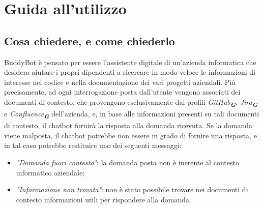 
\section{Guida all’utilizzo}
\label{sec:guida_utilizzo}


\subsection{Cosa chiedere, e come chiederlo}
\label{subsec:cosa_come_chiedere}

BuddyBot è pensato per essere l'assistente digitale di un'azienda informatica che desidera aiutare i propri dipendenti a ricercare in
modo veloce le informazioni di interesse nel codice e nella documentazione dei vari progetti aziendali. Più precisamente, ad
ogni interrogazione posta dall'utente vengono associati
dei documenti di contesto, che provengono esclusivamente dai profili \emph{GitHub}\textsubscript{\textbf{\textit{G}}},
\emph{Jira}\textsubscript{\textbf{\textit{G}}} e \emph{Confluence}\textsubscript{\textbf{\textit{G}}} dell'azienda, e, in base alle
informazioni presenti su tali documenti di contesto, il chatbot fornirà la risposta alla domanda ricevuta.
Se la domanda viene malposta, il chatbot potrebbe non essere in grado di fornire una risposta, e in tal caso potrebbe restituire
uno dei seguenti messaggi:
\begin{itemize}
    \item \emph{"Domanda fuori contesto"}: la domanda posta non è inerente al contesto informatico aziendale;
    \item \emph{"Informazione non trovata"}: non è stato possibile trovare nei documenti di contesto informazioni utili per rispondere
    alla domanda.
\end{itemize}

